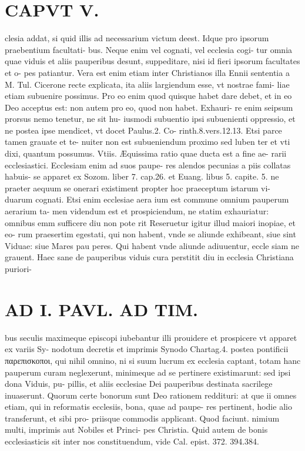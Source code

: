 \documentclass{article}
\begin{document}
\begin{pages}
\section*{CAPVT  V. }
\marginpar{[ p.303 ]}\pstart clesia addat, si quid illis ad necessarium victum deest. Idque pro ipsorum praebentium facultati- bus. Neque enim vel cognati, vel ecclesia cogi- tur omnia quae viduis et aliis pauperibus desunt, suppeditare, nisi id fieri ipsorum facultates et o- pes patiantur. Vera est enim etiam inter Christianos illa Ennii sententia a M. Tul. Cicerone recte explicata, ita aliis largiendum esse, vt nostrae fami- liae etiam subuenire possimus. Pro eo enim quod quisque habet dare debet, et in eo Deo acceptus est: non autem pro eo, quod non habet. Exhauri- re enim seipsum prorsus nemo tenetur, ne sit hu- iusmodi subuentio ipsi subuenienti oppressio, et ne postea ipse mendicet, vt docet Paulus.2. Co- rinth.8.vers.12.13. Etsi parce tamen grauate et te- nuiter non est subueniendum proximo sed luben ter et vti dixi, quantum possumus.  \pend\pstart Vtiis. Æquissima ratio quae ducta est a fine ae- rarii ecclesiastici. Ecclesiam enim ad suos paupe- res alendos pecunias a piis collatas habuis- se apparet ex Sozom. liber  7. cap.26. et Euang. libus  5. capite. 5. ne praeter aequum se onerari existiment propter hoc praeceptum istarum vi- duarum cognati. Etsi enim ecclesiae aera ium est commune omnium pauperum aerarium ta- men videndum est et prospiciendum, ne statim exhauriatur: omnibus emm sufficere diu non pote rit Reseruetur igitur illud maiori inopiae, et eo- rum praesertim egestati, qui non habent, vnde se aliunde exhibeant, siue sint Viduae: siue Mares pau peres. Qui habent vnde aliunde adiuuentur, eccle siam ne grauent. Haec sane de pauperibus viduis cura perstitit diu in ecclesia Christiana puriori-  \pend
\section*{AD I. PAVL. AD TIM. }
\marginpar{[ p.304 ]}\pstart bus seculis maximeque episcopi iubebantur illi prouidere et prospicere vt apparet ex variis Sy- nodotum decretis et imprimis Synodo Chartag.4. postea pontificii παρεπισκοποι, qui nihil omnino, ni si suum lucrum ex ecclesia captant, totam hanc pauperum curam neglexerunt, minimeque ad se pertinere existimarunt: sed ipsi dona Viduis, pu- pillis, et aliis ecclesiae Dei pauperibus destinata sacrilege inuaserunt. Quorum certe bonorum sunt Deo rationem reddituri: at que ii omnes etiam, qui in reformatis ecclesiis, bona, quae ad paupe- res pertinent, hodie alio transferunt, et sibi pro- priisque commodis applicant. Quod faciunt. nimium multi, imprimis aut Nobiles et Princi- pes Christia. Quid autem de bonis ecclesiasticis sit inter nos constituendum, vide Cal. epist. 372. 394.384.  \pend
{}
{}

\end{pages}
\end{document}

